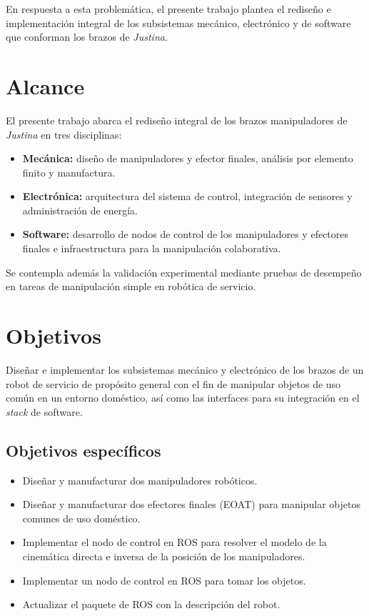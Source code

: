 En respuesta a esta problemática, el presente trabajo plantea el rediseño e implementación integral de los subsistemas mecánico, electrónico y de software que conforman los brazos de \emph{Justina}.

\section{Alcance}

El presente trabajo abarca el rediseño integral de los brazos manipuladores de \emph{Justina} en tres disciplinas:

\begin{itemize}
    \item \textbf{Mecánica:} diseño de manipuladores y efector finales, análisis por elemento finito y manufactura.
    \item \textbf{Electrónica:} arquitectura del sistema de control, integración de sensores y administración de energía.
    \item \textbf{Software:} desarrollo de nodos de control de los manipuladores y efectores finales e infraestructura para la manipulación colaborativa.
\end{itemize}

Se contempla además la validación experimental mediante pruebas de desempeño en tareas de manipulación simple en robótica de servicio.

\section{Objetivos}

Diseñar e implementar los subsistemas mecánico y electrónico de los brazos de un robot de servicio de propósito general con el fin de manipular objetos de uso común en un entorno doméstico, así como las interfaces para su integración en el \emph{stack} de software.

\subsection{Objetivos específicos}

\begin{itemize}
    \item Diseñar y manufacturar dos manipuladores robóticos.
    \item Diseñar y manufacturar dos efectores finales (EOAT) para manipular objetos comunes de uso doméstico.
    \item Implementar el nodo de control en ROS para resolver el modelo de la cinemática directa e inversa de la posición de los manipuladores.
    \item Implementar un nodo de control en ROS para tomar los objetos.
    \item Actualizar el paquete de ROS con la descripción del robot.
\end{itemize}

